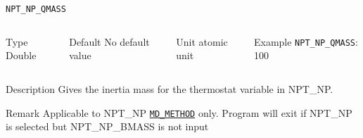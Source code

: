 \begin{frame}[allowframebreaks]{\texttt{NPT\_NP\_QMASS}} \label{NPT_NP_QMASS}
\vspace*{-12pt}
\begin{columns}
\begin{block}{Type}
Double
\end{block}

\begin{block}{Default}
No default value
\end{block}

\begin{block}{Unit}
atomic unit
\end{block}

\begin{block}{Example}
\texttt{NPT\_NP\_QMASS}: 100
\end{block}
\end{columns}

\begin{block}{Description}
Gives the inertia mass for the thermostat variable in NPT\_NP.
\end{block}

\begin{block}{Remark}
Applicable to NPT\_NP \hyperlink{MD_METHOD}{\texttt{MD\_METHOD}} only.
Program will exit if NPT\_NP is selected but NPT\_NP\_BMASS is not input
\end{block}

\end{frame}



